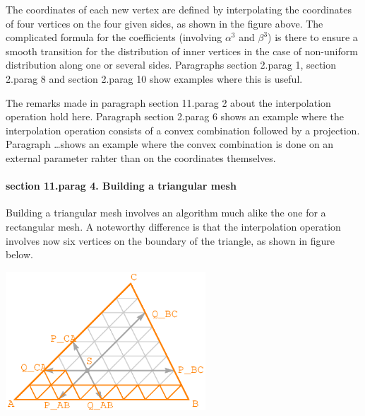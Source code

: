 The coordinates of each new vertex are defined by interpolating the coordinates of four vertices
on the four given sides, as shown in the figure above.
The complicated formula for the coefficients (involving $ \alpha^3 $ and $ \beta^3 $) is there
to ensure a smooth transition for the distribution of inner vertices in the case of non-uniform
distribution along one or several sides.
Paragraphs \numb section 2.\numb parag 1, \numb section 2.\numb parag 8 and
\numb section 2.\numb parag 10 show examples where this is useful.

The remarks made in paragraph \numb section 11.\numb parag 2 about the interpolation operation
hold here.
Paragraph \numb section 2.\numb parag 6 shows an example where the interpolation operation
consists of a convex combination followed by a projection.
Paragraph \dots shows an example where the convex combination is done on an external parameter
rahter than on the coordinates themselves.


\paragraph{\numb section 11.\numb parag 4. Building a triangular mesh}

Building a triangular mesh involves an algorithm much alike the one for a rectangular mesh.
A noteworthy difference is that the interpolation operation involves now six vertices on
the boundary of the triangle, as shown in figure below.

{ 
\centerline{\includegraphics[width=75mm]{fig-triangle.eps}} }

